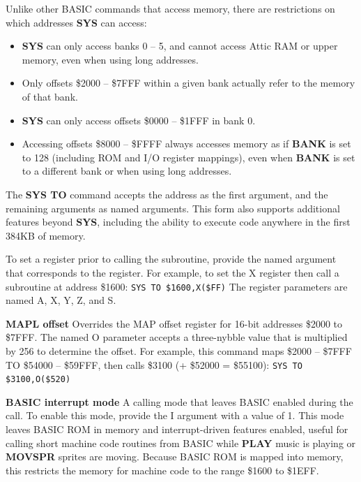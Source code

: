 \begin{description}[leftmargin=2cm,style=nextline]
                  Unlike other BASIC commands that access memory, there are restrictions on which addresses {\bf SYS} can access:

                  \begin{itemize}
                     \item {\bf SYS} can only access banks 0 -- 5, and cannot access Attic RAM or upper memory, even when using long addresses.
                     \item Only offsets \$2000 -- \$7FFF within a given bank actually refer to the memory of that bank.
                     \item {\bf SYS} can only access offsets \$0000 -- \$1FFF in bank 0.
                     \item Accessing offsets \$8000 -- \$FFFF always accesses memory as if {\bf BANK} is set to 128 (including ROM and I/O register mappings), even when {\bf BANK} is set to a different bank or when using long addresses.
                  \end{itemize}

\item [SYS TO form:] The {\bf SYS TO} command accepts the address as the first argument, and the remaining arguments as named arguments. This form also supports additional features beyond {\bf SYS}, including the ability to execute code anywhere in the first 384KB of memory.

                  To set a register prior to calling the subroutine, provide the named argument that corresponds to the register. For example, to set the X register then call a subroutine at address \$1600: \texttt{SYS TO \$1600,X(\$FF)} The register parameters are named A, X, Y, Z, and S.

                  {\bf MAPL offset} Overrides the MAP offset register for 16-bit addresses \$2000 to \$7FFF. The named O parameter accepts a three-nybble value that is multiplied by 256 to determine the offset. For example, this command maps \$2000 -- \$7FFF TO \$54000 -- \$59FFF, then calls \$3100 (+ \$52000 = \$55100): \texttt{SYS TO \$3100,O(\$520)}

                  {\bf BASIC interrupt mode} A calling mode that leaves BASIC enabled during the call. To enable this mode, provide the I argument with a value of 1. This mode leaves BASIC ROM in memory and interrupt-driven features enabled, useful for calling short machine code routines from BASIC while {\bf PLAY} music is playing or {\bf MOVSPR} sprites are moving. Because BASIC ROM is mapped into memory, this restricts the memory for machine code to the range \$1600 to \$1EFF.


\end{description}
